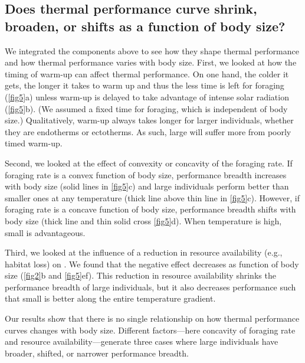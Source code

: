 


\subsection*{Does thermal performance curve shrink, broaden, or shifts as a function of body size?}
We integrated the components above to see how they shape thermal performance and how thermal performance varies with body size.
First, we looked at how the timing of warm-up can affect thermal performance.
On one hand, the colder it gets, the longer it takes to warm up and thus the less time is left for foraging (\cref{fig5}a) unless warm-up is delayed to take advantage of intense solar radiation (\cref{fig5}b).
(We assumed a fixed time for foraging, which is independent of body size.)
Qualitatively, warm-up always takes longer for larger individuals, whether they are endotherms or ectotherms.
As such, large will suffer more from poorly timed warm-up.

Second, we looked at the effect of convexity or concavity of the foraging rate.
If foraging rate is a convex function of body size, performance breadth increases with body size (solid lines in \cref{fig5}c) and large individuals perform better than smaller ones at any temperature (thick line above thin line in \cref{fig5}c).
However, if foraging rate is a concave function of body size, performance breadth shifts with body size (thick line and thin solid cross \cref{fig5}d).
When temperature is high, small is advantageous.

Third, we looked at the influence of a reduction in resource availability (e.g., habitat loss) on .
We found that the negative effect decreases as function of body size (\cref{fig2}b and \cref{fig5}ef).
This reduction in resource availability shrinks the performance breadth of large individuals, but it also decreases performance such that small is better along the entire temperature gradient.


Our results show that there is no single relationship on how thermal performance curves changes with body size.
Different factors---here concavity of foraging  rate and resource availability---generate three cases where large individuals have broader, shifted, or narrower performance breadth.
